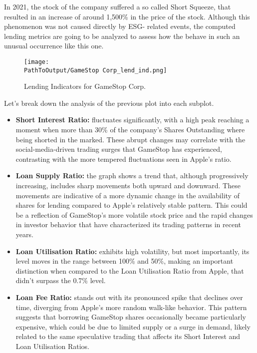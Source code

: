 In 2021, the stock of the company suffered a so called Short Squeeze, that resulted in an increase of around 1,500\% in the price of the stock. Although this phenomenon was not caused directly by ESG- related events, the computed lending metrics are going to be analyzed to assess how the behave in such an unusual occurrence like this one.

\begin{figure}[H]
	\centering
	\caption{Lending Indicators for GameStop Corp.}
	  \centering
	  \texttt{[image: \\PathToOutput/GameStop Corp\_lend\_ind.png]}
	\label{fig:gamestop_lending_indicators}
\end{figure}

Let's break down the analysis of the previous plot into each subplot.

\begin{itemize}
	\item\textbf{Short Interest Ratio:} fluctuates significantly, with a high peak reaching a moment when more than 30\% of the company's Shares Outstanding where being shorted in the marked. These abrupt changes may correlate with the social-media-driven trading surges that GameStop has experienced, contrasting with the more tempered fluctuations seen in Apple's ratio.
	\item\textbf{Loan Supply Ratio:} the graph shows a trend that, although progressively increasing, includes sharp movements both upward and downward. These movements are indicative of a more dynamic change in the availability of shares for lending compared to Apple's relatively stable pattern. This could be a reflection of GameStop's more volatile stock price and the rapid changes in investor behavior that have characterized its trading patterns in recent years.
	\item\textbf{Loan Utilisation Ratio:} exhibits high volatility, but most importantly, its level moves in the range between 100\% and 50\%, making an important distinction when compared to the Loan Utilisation Ratio from Apple, that didn't surpass the 0.7\% level.
	\item\textbf{Loan Fee Ratio:} stands out with its pronounced spike that declines over time, diverging from Apple's more random walk-like behavior. This pattern suggests that borrowing GameStop shares occasionally became particularly expensive, which could be due to limited supply or a surge in demand, likely related to the same speculative trading that affects its Short Interest and Loan Utilisation Ratios.
\end{itemize}

